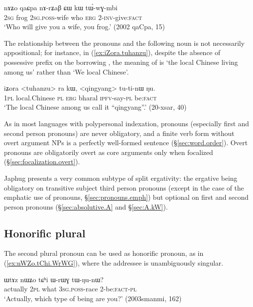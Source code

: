 \begin{exe}
\ex  \label{ex:nAZo.qaCpa}
\gll  nɤʑo qaɕpa nɤ-rʑaβ ɕɯ kɯ tɯ́-wɣ-mbi  \\
 \textsc{2sg} frog \textsc{2sg}.\textsc{poss}-wife who \textsc{erg} 2-\textsc{inv}-give:\textsc{fact} \\
\glt `Who will give you a wife, you frog.'   (2002 qaCpa, 15)
\end{exe} 

The relationship between the pronouns and the following noun is not necessarily appositional; for instance, in (\ref{ex:iZora.tuhanzu}), despite the absence of possessive prefix on the borrowing , the meaning of  is `the local Chinese living among us' rather than `We local Chinese'.

\begin{exe}
\ex \label{ex:iZora.tuhanzu}
\gll iʑora <tuhanzu> ra kɯ, <qingyang> tu-ti-nɯ ŋu. \\
\textsc{1pl} local.Chinese \textsc{pl} \textsc{erg} bharal \textsc{ipfv}-say-\textsc{pl} be:\textsc{fact} \\
\glt `The local Chinese among us call it ``qingyang''.' (20-xsar, 40)
\end{exe} 

As in most languages with polypersonal indexation, pronouns (especially first and second person pronouns) are never obligatory, and a finite verb form without overt argument NPs is a perfectly well-formed sentence (§\ref{sec:word.order}). Overt pronouns are obligatorily overt as core arguments only when focalized (§\ref{sec:focalization.overt}).

Japhug presents a very common subtype of split ergativity: the ergative  being obligatory on transitive subject third person pronouns (except in the case of the emphatic use of pronouns, §\ref{sec:pronouns.emph}) but optional on first and second person pronouns (§\ref{sec:absolutive.A} and §\ref{sec:A.kW}).

\subsection{Honorific plural} \label{sec:honorific.pronouns}
The second plural pronoun  can be used as  honorific pronoun, as in (\ref{ex:nWZo.tChi.WrWG}), where the addressee is unambiguously singular.

\begin{exe}
\ex \label{ex:nWZo.tChi.WrWG}
\gll ɯtɤz nɯʑo tɕʰi ɯ-rɯɣ tɯ-ŋu-nɯ? \\
actually \textsc{2pl} what \textsc{3sg}.\textsc{poss}-race 2-be:\textsc{fact}-\textsc{pl} \\
\glt `Actually, which type of being are you?' (2003smanmi, 162)
\end{exe}

